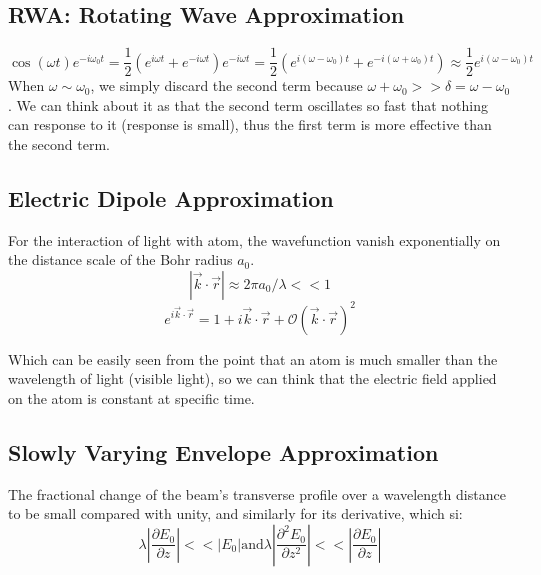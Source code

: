 \subsection{RWA: Rotating Wave Approximation}
\[
    \cos(\omega t)e^{-i\omega_0 t} = \frac{1}{2}(e^{i\omega t} + e^{-i\omega t})e^{-i\omega t} = \frac{1}{2}(e^{i(\omega - \omega_0)t} + e^{-i(\omega + \omega_0)t}) \approx \frac{1}{2}e^{i(\omega - \omega_0)t}
\]
When $\omega \sim \omega_0$, we simply discard the second term because
$\omega + \omega_0 >> \delta = \omega - \omega_0$. We can think about it
as that the second term oscillates so fast that nothing can response to it
(response is small), thus the first term is more effective than the second
term.


\subsection{Electric Dipole Approximation}
For the interaction of light with atom, the wavefunction vanish 
exponentially on the distance scale of the Bohr radius $a_0$.
\[
    |\vec{k} \cdot \vec{r}| \approx 2\pi a_0/\lambda << 1 
\]
\[
    e^{i\vec{k} \cdot \vec{r}} = 1 + i\vec{k}\cdot\vec{r} + \mathcal{O}(\vec{k}\cdot\vec{r})^2
\]

Which can be easily seen from the point that an atom is much smaller than 
the wavelength of light (visible light), so we can think that the 
electric field applied on the atom is constant at specific time.




\subsection{Slowly Varying Envelope Approximation}
The fractional change of the beam's transverse profile over a wavelength
distance to be small compared with unity, and similarly for its 
derivative, which si:
\[
    \lambda|\frac{\partial E_0}{\partial z}| << |E_0| 
    \text{and} 
    \lambda|\frac{\partial^2 E_0}{\partial z^2}| << |\frac{\partial E_0}{\partial z}| 
\]



